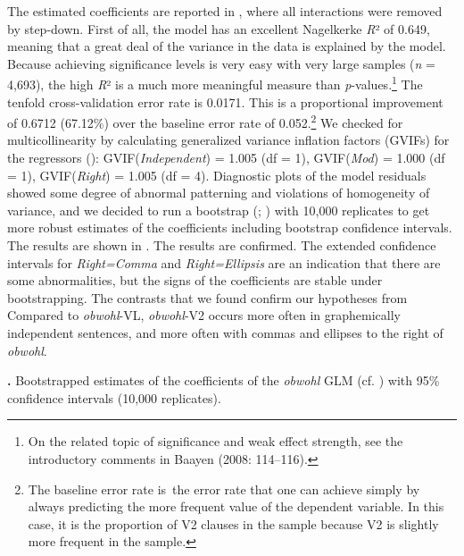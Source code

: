 \begin{styleMoutonTextBetweenFigureTable}
The estimated coefficients are reported in , where all interactions were removed by step-down. First of all, the model has an excellent Nagelkerke \textit{R}² of 0.649, meaning that a great deal of the variance in the data is explained by the model. Because achieving significance levels is very easy with very large samples (\textit{n} = 4,693), the high \textit{R}² is a much more meaningful measure than \textit{p}{}-values.\footnote{On the related topic of significance and weak effect strength, see the introductory comments in Baayen (2008: 114–116).} The tenfold cross-validation error rate is 0.0171. This is a proportional improvement of 0.6712 (67.12\%) over the baseline error rate of 0.052.\footnote{The baseline error rate is~the error rate that one can achieve simply by always predicting the more frequent value of the dependent variable. In this case, it is the proportion of V2 clauses in the sample because V2 is slightly more frequent in the sample.} We checked for multicollinearity by calculating generalized variance inflation factors (GVIFs) for the regressors (\citealt{FoxMonette1992}): GVIF(\textit{Independent}) = 1.005 (df = 1), GVIF(\textit{Mod}) = 1.000 (df = 1), GVIF(\textit{Right}) = 1.005 (df = 4). Diagnostic plots of the model residuals showed some degree of abnormal patterning and violations of homogeneity of variance, and we decided to run a bootstrap (\citealt{DavisonHinkley1997}; \citealt{FoxWeisberg2011}) with 10,000 replicates to get more robust estimates of the coefficients including bootstrap confidence intervals. The results are shown in . The results are confirmed. The extended confidence intervals for \textit{Right=Comma} and \textit{Right=Ellipsis} are an indication that there are some abnormalities, but the signs of the coefficients are stable under bootstrapping. The contrasts that we found confirm our hypotheses from  Compared to \textit{obwohl}{}-VL, \textit{obwohl}{}-V2 occurs more often in graphemically independent sentences, and more often with commas and ellipses to the right of \textit{obwohl}.
\end{styleMoutonTextBetweenFigureTable}

\bfseries
  
 

\begin{styleMoutonCaption}
\textbf{.} Bootstrapped estimates of the coefficients of the \textit{obwohl} GLM (cf. ) with 95\% confidence intervals (10,000 replicates).
\end{styleMoutonCaption}

